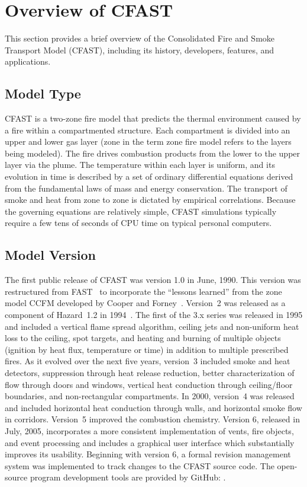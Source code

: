 \documentclass[11pt]{book}
\begin{document}
\section{Overview of CFAST}

This section provides a brief overview of the Consolidated Fire and Smoke Transport Model (CFAST), including its history, developers, features, and applications.

\subsection{Model Type}

CFAST is a two-zone fire model that predicts the thermal environment caused by a fire within a compartmented structure. Each compartment is divided into an upper and lower gas layer (zone in the term zone fire model refers to the layers being modeled). The fire drives combustion products from the lower to the upper layer via the plume. The temperature within each layer is uniform, and its evolution in time is described by a set of ordinary differential equations derived from the fundamental laws of mass and energy conservation. The transport of smoke and heat from zone to zone is dictated by empirical correlations. Because the governing equations are relatively simple, CFAST simulations typically require a few tens of seconds of CPU time on typical personal computers.


\subsection{Model Version}

The first public release of CFAST was version 1.0 in June, 1990. This version was restructured from FAST~\cite{Models:FAST} to incorporate the ``lessons learned'' from the zone model CCFM developed by Cooper and Forney~\cite{Models:CCFM}. Version~2 was released as a component of Hazard~1.2 in 1994~\cite{Models:HAZARDI, Models:HAZARDI_12}. The first of the 3.x series was released in 1995 and included a vertical flame spread algorithm, ceiling jets and non-uniform heat loss to the ceiling, spot targets, and heating and burning of multiple objects (ignition by heat flux, temperature or time) in addition to multiple prescribed fires. As it evolved over the next five years, version~3 included smoke and heat detectors, suppression through heat release reduction, better characterization of flow through doors and windows, vertical heat conduction through ceiling/floor boundaries, and non-rectangular compartments. In 2000, version~4 was released and included horizontal heat conduction through walls, and horizontal smoke flow in corridors. Version~5 improved the combustion chemistry. Version 6, released in July, 2005, incorporates a more consistent implementation of vents, fire objects, and event processing and includes a graphical user interface which substantially improves its usability. Beginning with version 6, a formal revision management system was implemented to track changes to the CFAST source code. The open-source program development tools are provided by GitHub: \href{https://github.com}{}.
\end{document}
